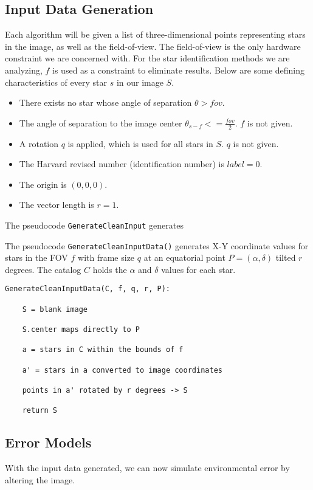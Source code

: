 \subsection{Input Data Generation}
Each algorithm will be given a list of three-dimensional points representing stars in the image, as well as the field-of-view. The field-of-view is the only hardware constraint we are concerned with. For the star identification methods we are analyzing, $f$ is used as a constraint to eliminate results. Below are some defining characteristics of every star $s$ in our image $S$.

\begin{itemize}
\item There exists no star whose angle of separation $\theta > fov$. 
\item The angle of separation to the image center $\theta_{s-f} <= \frac{fov}{2}$. $f$ is not given.
\item A rotation $q$ is applied, which is used for all stars in $S$. $q$ is not given.
\item The Harvard revised number (identification number) is $label = 0$.
\item The origin is $(0, 0, 0)$.
\item The vector length is $r=1$.
\end{itemize}

The pseudocode \texttt{GenerateCleanInput} generates 

The pseudocode \texttt{GenerateCleanInputData()} generates X-Y coordinate values for stars in the FOV $f$ with frame size $q$ at an equatorial point $P = (\alpha, \delta)$ tilted $r$ degrees. The catalog $C$ holds the $\alpha$ and $\delta$ values for each star.

\begin{lstlisting}[breaklines=true, showspaces=false]
GenerateCleanInputData(C, f, q, r, P):

	S = blank image
	
	S.center maps directly to P
 
	a = stars in C within the bounds of f
	                    
	a' = stars in a converted to image coordinates
	
	points in a' rotated by r degrees -> S
	
	return S
\end{lstlisting}

\subsection{Error Models}
With the input data generated, we can now simulate environmental error by altering the image. 
